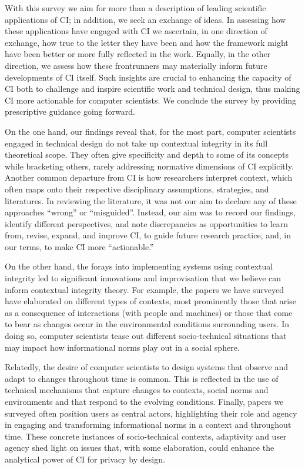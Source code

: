 \documentclass[../thesis.tex]{subfiles}
\begin{document}
With this survey we aim for more than a description of leading
scientific applications of CI; in addition, we seek an exchange of
ideas. In assessing how these applications have engaged with CI we
ascertain, in one direction of exchange, how true to the letter they
have been and how the framework might have been better or more fully
reflected in the work. Equally, in the other direction, we assess how
these frontrunners may materially inform future developments of CI
itself. Such insights are crucial to enhancing the capacity of CI both
to challenge and inspire scientific work and technical design, thus
making CI more actionable for computer scientists. We conclude the
survey by providing prescriptive guidance going forward.

On the one hand, our findings reveal that, for the most part, computer
scientists engaged in technical design do not take up contextual
integrity in its full theoretical scope. They often give specificity
and depth to some of its concepts while bracketing others, rarely
addressing normative dimensions of CI explicitly. Another common
departure from CI is how researchers interpret context, which often
maps onto their respective disciplinary assumptions, strategies, and
literatures. In reviewing the literature, it was not our aim to declare
any of these approaches ``wrong'' or
``misguided''. Instead, our aim was
to record our findings, identify different perspectives, and note
discrepancies as opportunities to learn from, revise, expand, and
improve CI, to guide future research practice, and, in our terms, to
make CI more ``actionable.''

On the other hand, the forays into implementing systems using contextual
integrity led to significant innovations and improvisation that we
believe can inform contextual integrity theory.
For example, the papers
we have surveyed have elaborated on different types of contexts, most
prominently those that arise as a consequence of interactions (with
people and machines)
or those that come to bear as changes occur in the
environmental conditions surrounding users. In doing so, computer
scientists tease out different socio-technical situations that may
impact how informational norms play out in a social sphere.

Relatedly, the desire of computer scientists to design systems that
observe and adapt to changes throughout time is common. This is
reflected in the use of technical mechanisms that capture changes to
contexts, social norms and environments and that respond to the
evolving conditions. Finally, papers we surveyed often position users
as central actors, highlighting their role and agency in engaging and
transforming informational norms in a context and throughout time.
These concrete instances of socio-technical contexts, adaptivity and
user agency shed light on issues that, with some elaboration, could
enhance the analytical power of CI for privacy by design.
\end{document}
